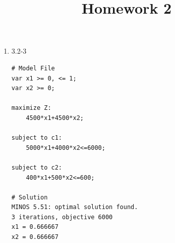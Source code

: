 \documentclass[12pt, letter]{article}
\title{ Homework 2 }
\begin{document}
\maketitle
\thispagestyle{fancy}

\begin{enumerate}
	\item 3.2-3
\begin{verbatim}
# Model File
var x1 >= 0, <= 1;
var x2 >= 0;
 
maximize Z:
    4500*x1+4500*x2;
 
subject to c1:
    5000*x1+4000*x2<=6000;
 
subject to c2:
    400*x1+500*x2<=600;

# Solution
MINOS 5.51: optimal solution found.
3 iterations, objective 6000
x1 = 0.666667
x2 = 0.666667
\end{verbatim}


\end{enumerate}
\end{document}
